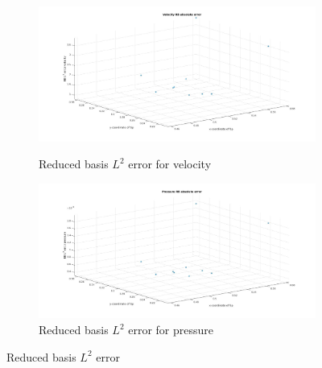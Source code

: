 \documentclass[a4paper,oneside,openright,spanish,english]{book}
\begin{document}
\begin{figure}
\begin{subfigure}{\textwidth}	
  \includegraphics[width=\linewidth]{rb_l2_error_velocity.jpg}
  \caption{Reduced basis $L^2$ error for velocity} 
  \label{rb_L2_error_velocity}
  \includegraphics[width=\linewidth]{rb_l2_error_pressure.jpg}
  \caption{Reduced basis $L^2$ error for pressure} 
  \label{rb_L2_error_pressure}
\end{subfigure}
\caption{Reduced basis $L^2$ error}
\label{rb_error}
\end{figure}
\end{document}
